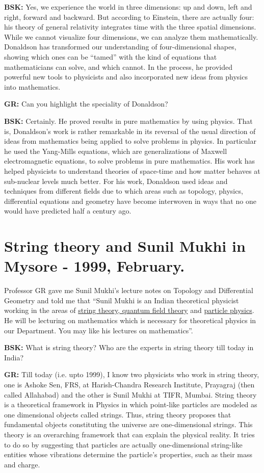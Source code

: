 \textbf{BSK:}  Yes, we experience the world in three dimensions: up and down, left and right, forward and backward. But according to Einstein, there are actually four: his theory of general relativity integrates time with the three spatial dimensions. While we cannot visualize four dimensions, we can analyze them mathematically. Donaldson has transformed our understanding of four-dimensional shapes, showing which ones can be “tamed” with the kind of equations that mathematicians can solve, and which cannot. In the process, he provided powerful new tools to physicists and also incorporated new ideas from physics into mathematics.

\textbf{GR:} Can you highlight the speciality of Donaldson?

\textbf{BSK:} Certainly. He proved results in pure mathematics by using physics. That is, Donaldson’s work is rather remarkable in its reversal of the usual direction of ideas from mathematics being applied to solve problems in physics. In particular he used the Yang-Mills equations, which are generalizations of Maxwell electromagnetic equations, to solve problems in pure mathematics.  His work has helped physicists to understand theories of space-time and how matter behaves at sub-nuclear levels much better. For his work, Donaldson used ideas and techniques from different fields due to which areas such as topology, physics, differential equations and geometry have become interwoven in ways that no one would have predicted half a century ago.

\section*{String theory and Sunil Mukhi in\\ Mysore - 1999, February.}

Professor GR gave me Sunil Mukhi’s lecture notes on Topology and Differential Geometry and told me that “Sunil Mukhi is an Indian theoretical physicist working in the areas of \underline{string theory, quantum field theory} and \underline{particle physics}. He will be lecturing on mathematics which is necessary for theoretical physics in our Department. You may like his lectures on mathematics”.

\textbf{BSK:} What is string theory? Who are the experts in string theory till today in India?

\textbf{GR:} Till today (i.e. upto 1999), I know two physicists who work in string theory, one is Ashoke Sen, FRS, at Harish-Chandra Research Institute, Prayagraj (then called Allahabad) and the other is Sunil Mukhi at TIFR, Mumbai. String theory is a theoretical framework in Physics in which point-like particles are modeled as one dimensional objects called strings. Thus, string theory proposes that fundamental objects constituting the universe are one-dimensional strings. This theory is an overarching framework that can explain the physical reality. It tries to do so by suggesting that particles are actually one-dimensional string-like entities whose vibrations determine the particle’s properties, such as their mass and charge.

